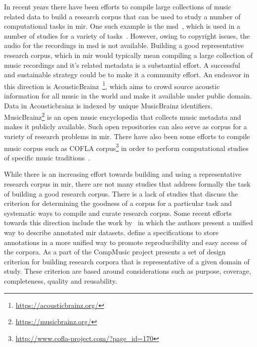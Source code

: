 In recent years there have been efforts to compile large collections of music related data to build a research corpus that can be used to study a number of computational tasks in \gls{mir}. One such example is the \gls{msd}~\citep{Bertin-Mahieux2011}, which is used in a number of studies for a variety of tasks~\citep{serra2012measuring,sturm2012survey}. However, owing to copyright issues, the audio for the recordings in \gls{msd} is not available. Building a good representative research corpus, which in \gls{mir} would typically mean compiling a large collection of music recordings and it's related metadata is a substantial effort. A successful and sustainable strategy could be to make it a community effort. An endeavor in this direction is AcousticBrainz~\citep{porter2015acousticbrainz}\footnote{\url{https://acousticbrainz.org/}}, which aims to crowd source acoustic information for all music in the world and make it available under public domain. Data in Acousticbrainz is indexed by unique MusicBrainz identifiers. MusicBrainz\footnote{\url{https://musicbrainz.org/}} is an open music encyclopedia that collects music metadata and makes it publicly available. Such open repositories can also serve as corpus for a variety of research problems in \gls{mir}. There have also been some efforts to compile music corpus such as COFLA corpus\footnote{\url{http://www.cofla-project.com/?page_id=170}} in order to perform computational studies of specific music traditions~\citep{kroher2016corpus}.

While there is an increasing effort towards building and using a representative research corpus in \gls{mir}, there are not many studies that address formally the task of building a good research corpus. There is a lack of studies that discuss the criterion for determining the goodness of a corpus for a particular task and systematic ways to compile and curate research corpus. Some recent efforts towards this direction include the work by~\cite{peeters2012towards} in which the authors present a unified way to describe annotated \Gls{mir} datasets. \cite{Humphrey:JAMS:ISMIR:14} define a specifications to store annotations in a more unified way to promote reproducibility and easy access of the corpora. As a part of the CompMusic project \cite{serra:14:corpus} presents a set of design criterion for building research corpora that is representative of a given domain of study. These criterion are based around considerations such as purpose, coverage, completeness, quality and reusability.

